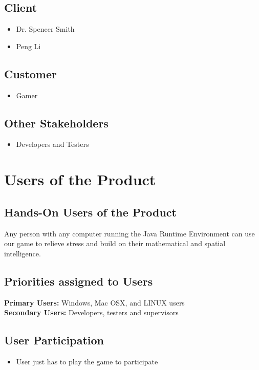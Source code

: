 \documentclass[12pt]{article}
\begin{document}
\subsection{\color{red}Client}
\begin{itemize}
    \color{red}
    \item Dr. Spencer Smith
    \item Peng Li
\end{itemize}
\subsection{Customer}
\begin{itemize}
    \item Gamer
\end{itemize}
\subsection{Other Stakeholders}
\begin{itemize}
    \item Developers and Testers
\end{itemize}

\section{Users of the Product}
\subsection{Hands-On Users of the Product}
\par\indent\indent Any person with any computer running the Java Runtime Environment can use our game to relieve stress and build on their mathematical and spatial intelligence.
\subsection{Priorities assigned to Users}
\textbf{Primary Users:} Windows, Mac OSX, and LINUX users\\
\textbf{Secondary Users:} Developers, testers and supervisors

\subsection{User Participation}
\begin{itemize}
    \item User just has to play the game to participate
\end{itemize}
\end{document}
